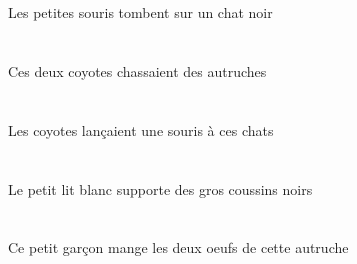 \begin{exe}
   \DEFPlAbsP{}   \petitBPlP{}   \sourisBPlAbsP{}    \INDSgOblP{}   \noirDSgP{}   \chatDSgOblP{}   \SURP{}  \tomberViPrsBPlP{} \\
   \DEFPlAbsG{}   \petitBPlG{}   \sourisBPlAbsG{}    \INDSgOblG{}   \noirDSgG{}   \chatDSgOblG{}   \SURG{}  \tomberViPrsBPlG{} \\
 Les petites souris tombent sur un chat noir
\ex\glll
   \DEMDuErg{}   \coyoteCDuErg{}   \INDPlAbs{}   \autrucheBPlAbs{}  \chasserVtPstBPl{} \\
   \DEMDuErgP{}   \coyoteCDuErgP{}   \INDPlAbsP{}   \autrucheBPlAbsP{}  \chasserVtPstBPlP{} \\
   \DEMDuErgG{}   \coyoteCDuErgG{}   \INDPlAbsG{}   \autrucheBPlAbsG{}  \chasserVtPstBPlG{} \\
 Ces deux coyotes chassaient des autruches
\ex\glll
   \DEFPlErg{}   \coyoteCPlErg{}    \DEMPlDat{}   \chatDPlDat{}   \INDSgAbs{}   \sourisBSgAbs{}  \lancerVdPstBSg{} \\
   \DEFPlErgP{}   \coyoteCPlErgP{}    \DEMPlDatP{}   \chatDPlDatP{}   \INDSgAbsP{}   \sourisBSgAbsP{}  \lancerVdPstBSgP{} \\
   \DEFPlErgG{}   \coyoteCPlErgG{}    \DEMPlDatG{}   \chatDPlDatG{}   \INDSgAbsG{}   \sourisBSgAbsG{}  \lancerVdPstBSgG{} \\
 Les coyotes lançaient une souris à ces chats
\ex\glll
   \DEFSgErg{}   \petitDSg{}   \blancDSg{}   \litDSgErg{}   \INDPlAbs{}   \grosBPl{}   \noirBPl{}   \coussinBPlAbs{}  \supporterVtPrsBPl{} \\
   \DEFSgErgP{}   \petitDSgP{}   \blancDSgP{}   \litDSgErgP{}   \INDPlAbsP{}   \grosBPlP{}   \noirBPlP{}   \coussinBPlAbsP{}  \supporterVtPrsBPlP{} \\
   \DEFSgErgG{}   \petitDSgG{}   \blancDSgG{}   \litDSgErgG{}   \INDPlAbsG{}   \grosBPlG{}   \noirBPlG{}   \coussinBPlAbsG{}  \supporterVtPrsBPlG{} \\
 Le petit lit blanc supporte des gros coussins noirs
\ex\glll
   \DEMSgErg{}   \petitDSg{}   \garconDSgErg{}   \DEFDuAbs{}    \DEMSgObl{}   \autrucheBSgObl{}   \DE{}   \oeufCDuAbs{}  \mangerVtPrsCDu{} \\
   \DEMSgErgP{}   \petitDSgP{}   \garconDSgErgP{}   \DEFDuAbsP{}    \DEMSgOblP{}   \autrucheBSgOblP{}   \DEP{}   \oeufCDuAbsP{}  \mangerVtPrsCDuP{} \\
   \DEMSgErgG{}   \petitDSgG{}   \garconDSgErgG{}   \DEFDuAbsG{}    \DEMSgOblG{}   \autrucheBSgOblG{}   \DEG{}   \oeufCDuAbsG{}  \mangerVtPrsCDuG{} \\
 Ce petit garçon mange les deux oeufs de cette autruche

\end{exe}
